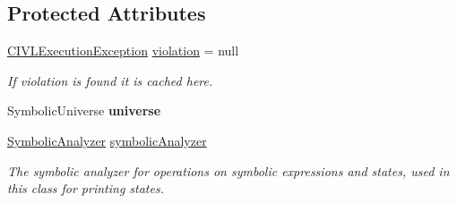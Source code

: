 \subsection*{Protected Attributes}
\begin{DoxyCompactItemize}
\item 
\hypertarget{classedu_1_1udel_1_1cis_1_1vsl_1_1civl_1_1predicate_1_1common_1_1CommonCIVLStatePredicate_a906fe43e66cd50ce5379a1ed7d1ea6c7}{}\hyperlink{classedu_1_1udel_1_1cis_1_1vsl_1_1civl_1_1log_1_1IF_1_1CIVLExecutionException}{C\+I\+V\+L\+Execution\+Exception} \hyperlink{classedu_1_1udel_1_1cis_1_1vsl_1_1civl_1_1predicate_1_1common_1_1CommonCIVLStatePredicate_a906fe43e66cd50ce5379a1ed7d1ea6c7}{violation} = null\label{classedu_1_1udel_1_1cis_1_1vsl_1_1civl_1_1predicate_1_1common_1_1CommonCIVLStatePredicate_a906fe43e66cd50ce5379a1ed7d1ea6c7}

\begin{DoxyCompactList}\small\item\em If violation is found it is cached here. \end{DoxyCompactList}\item 
\hypertarget{classedu_1_1udel_1_1cis_1_1vsl_1_1civl_1_1predicate_1_1common_1_1CommonCIVLStatePredicate_af068bb2c5301ff4fe29e0699f8ac1b03}{}Symbolic\+Universe {\bfseries universe}\label{classedu_1_1udel_1_1cis_1_1vsl_1_1civl_1_1predicate_1_1common_1_1CommonCIVLStatePredicate_af068bb2c5301ff4fe29e0699f8ac1b03}

\item 
\hypertarget{classedu_1_1udel_1_1cis_1_1vsl_1_1civl_1_1predicate_1_1common_1_1CommonCIVLStatePredicate_aae6b467bb269d59726bab69c91b5ccef}{}\hyperlink{interfaceedu_1_1udel_1_1cis_1_1vsl_1_1civl_1_1semantics_1_1IF_1_1SymbolicAnalyzer}{Symbolic\+Analyzer} \hyperlink{classedu_1_1udel_1_1cis_1_1vsl_1_1civl_1_1predicate_1_1common_1_1CommonCIVLStatePredicate_aae6b467bb269d59726bab69c91b5ccef}{symbolic\+Analyzer}\label{classedu_1_1udel_1_1cis_1_1vsl_1_1civl_1_1predicate_1_1common_1_1CommonCIVLStatePredicate_aae6b467bb269d59726bab69c91b5ccef}

\begin{DoxyCompactList}\small\item\em The symbolic analyzer for operations on symbolic expressions and states, used in this class for printing states. \end{DoxyCompactList}\end{DoxyCompactItemize}


